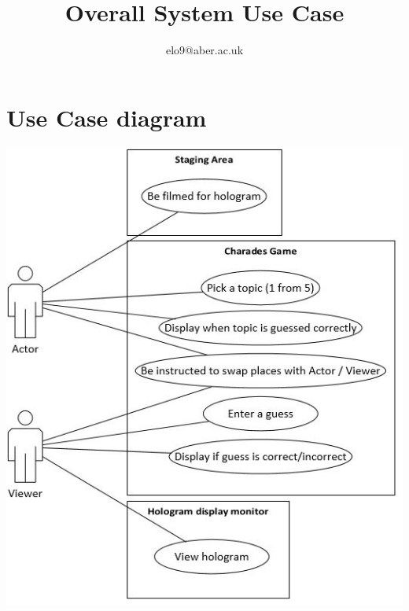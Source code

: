 \documentclass{article}
\title{Overall System Use Case}
\author{elo9@aber.ac.uk}
\begin{document}
\maketitle
\tableofcontents

\newpage

\section{Use Case diagram}
\includegraphics[width=\textwidth]{UseCaseImage}

\newpage
\end{document}
